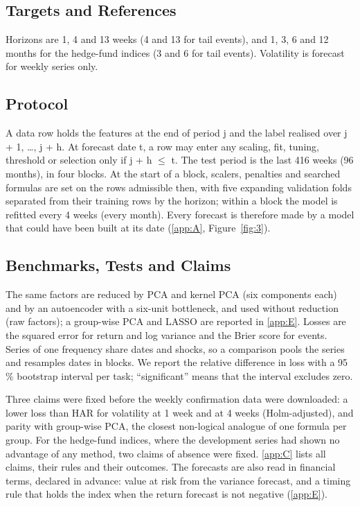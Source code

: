 \documentclass[review]{elsarticle}
\begin{document}
\subsection{Targets and References}\label{sec:5.2}



Horizons are 1, 4 and 13 weeks (4 and 13 for tail events), and 1, 3, 6 and 12 months for the hedge-fund indices (3 and 6 for tail events). Volatility is forecast for weekly series only.

\subsection{Protocol}\label{sec:5.3}

A data row holds the features at the end of period j and the label realised over j + 1, \ldots{}, j + h. At forecast date t, a row may enter any scaling, fit, tuning, threshold or selection only if j + h \ensuremath{\le} t. The test period is the last 416 weeks (96 months), in four blocks. At the start of a block, scalers, penalties and searched formulas are set on the rows admissible then, with five expanding validation folds separated from their training rows by the horizon; within a block the model is refitted every 4 weeks (every month). Every forecast is therefore made by a model that could have been built at its date (\ref{app:A}, Figure~\ref{fig:3}).

\subsection{Benchmarks, Tests and Claims}\label{sec:5.4}

The same factors are reduced by PCA and kernel PCA (six components each) and by an autoencoder with a six-unit bottleneck, and used without reduction (raw factors); a group-wise PCA and LASSO are reported in \ref{app:E}. Losses are the squared error for return and log variance and the Brier score for events. Series of one frequency share dates and shocks, so a comparison pools the series and resamples dates in blocks. We report the relative difference in loss with a 95\,\% bootstrap interval per task; ``significant'' means that the interval excludes zero.

Three claims were fixed before the weekly confirmation data were downloaded: a lower loss than HAR for volatility at 1 week and at 4 weeks (Holm-adjusted), and parity with group-wise PCA, the closest non-logical analogue of one formula per group. For the hedge-fund indices, where the development series had shown no advantage of any method, two claims of absence were fixed. \ref{app:C} lists all claims, their rules and their outcomes. The forecasts are also read in financial terms, declared in advance: value at risk from the variance forecast, and a timing rule that holds the index when the return forecast is not negative (\ref{app:E}).
\end{document}
